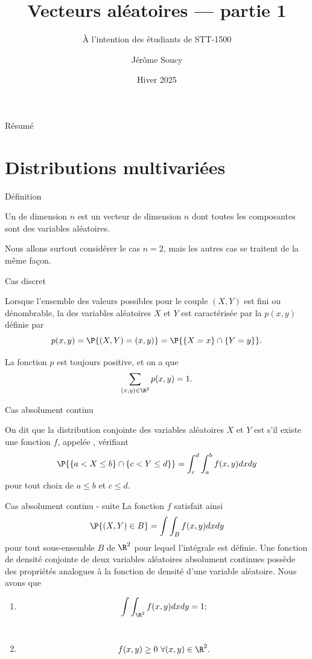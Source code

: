 \documentclass[nuit,charter,pied]{BeamerJS}
\title{Vecteurs aléatoires --- partie 1}
\subtitle{À l'intention des étudiants de STT-1500}
\institute{Université Laval}
\author{Jérôme Soucy}
\date{Hiver 2025}
\begin{document}
\begin{frame}
	\titlepage
\end{frame}

\begin{frame}{Résumé}
\tableofcontents
\end{frame}
\section{Distributions multivariées}
\begin{frame}[t]{Définition}
	\pause
	\begin{defn}{}
		Un  de dimension \(n\) est un vecteur de dimension \(n\) dont toutes les composantes sont des variables aléatoires.
	\end{defn}
	Nous allons surtout considérer le cas \(n=2\), mais les autres cas se traitent de la même façon.
\end{frame}
\begin{frame}[t]{Cas discret}
	\pause
	\begin{defn}{}
		Lorsque l'ensemble des valeurs possibles pour le couple \((X,Y)\) est fini ou dénombrable, la  des variables aléatoires $X$ et $Y$ est caractérisée par la  $p(x,y)$ définie par
		\[p(x,y)=\P{(X,Y)=(x,y)}=\P{\{X=x\}\cap\{Y=y\}}.\]
	\end{defn}
	\begin{rem}	La fonction $p$ est toujours positive, et on a que
	\[\sum_{(x,y)\in\R^2}p(x,y)=1.\]
	\end{rem}
\end{frame}
\begin{frame}[t]{Cas absolument continu}
	\pause
	\begin{defn}{}
		On dit que la distribution conjointe des variables aléatoires $X$ et $Y$ est  s'il existe une fonction $f$, appelée , vérifiant
		\[\P{\{a<X\leq b\}\cap\{c< Y\leq d\}}=\int_c^d\int_a^b f(x,y)dxdy\]
		pour tout choix de $a\leq b$ et $c\leq d$.
	\end{defn}
\end{frame}
\begin{frame}[t]{Cas absolument continu - suite}
	\pause
	La fonction $f$ satisfait ainsi
	\[\P{(X,Y)\in B}=\int\int_B f(x,y)dxdy\]
	pour tout sous-ensemble $B$ de $\R^2$ pour lequel l'intégrale est définie.
	\pause
	Une fonction de densité conjointe de deux variables aléatoires absolument continues possède des propriétés analogues à la fonction de densité d'une variable aléatoire. Nous avons que
	
	\begin{enumerate}
		\item \[\int\int_{\R^2}f(x,y)dxdy=1;\]\\
		\item \[f(x,y)\geq 0~\forall (x,y)\in\R^2.\]
	\end{enumerate}
\end{frame}
\end{document}
